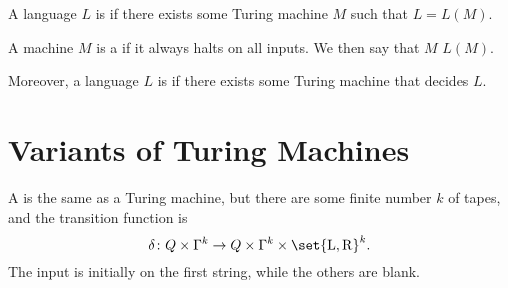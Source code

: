 \documentclass{standalone}
\begin{document}
\begin{definition}
  A language \(L\) is  if there exists
  some Turing machine \(M\) such that \(L = L(M)\).

  \tcblower
  A machine \(M\) is a  if it always halts on all inputs.
  We then say that \(M\)  \(L(M)\).

  Moreover, a language \(L\) is  if
  there exists some Turing machine that decides \(L\).
\end{definition}

\section{Variants of Turing Machines}
\begin{definition}
  A  is the same as a Turing machine,
  but there are some finite number \(k\) of tapes,
  and the transition function is
  \[
    \delta \colon Q \times \Gamma^k \to
                  Q \times \Gamma^k \times \set{\mathrm L, \mathrm R}^k.
  \]
  The input is initially on the first string, while the others are blank.
\end{definition}
\end{document}
